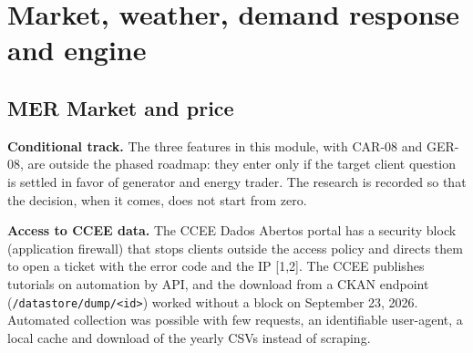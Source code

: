 
\section{Market, weather, demand response and engine}

\subsection{MER \textperiodcentered{} Market and price}

\begin{nota}
\textbf{Conditional track.} The three features in this module, with CAR-08 and
GER-08, are outside the phased roadmap: they enter only if the target client
question is settled in favor of generator and energy trader. The research
is recorded so that the decision, when it comes, does not start from zero.
\end{nota}

\begin{nota}
\textbf{Access to CCEE data.} The CCEE Dados Abertos portal has a security
block (application firewall) that stops clients outside the access policy
and directs them to open a ticket with the error code and the IP [1,2]. The
CCEE publishes tutorials on automation by API, and the download from a CKAN
endpoint (\texttt{/datastore/dump/<id>}) worked without a block on September 23, 2026.
Automated collection was possible with few requests, an identifiable
user-agent, a local cache and download of the yearly CSVs instead of scraping.
\end{nota}

